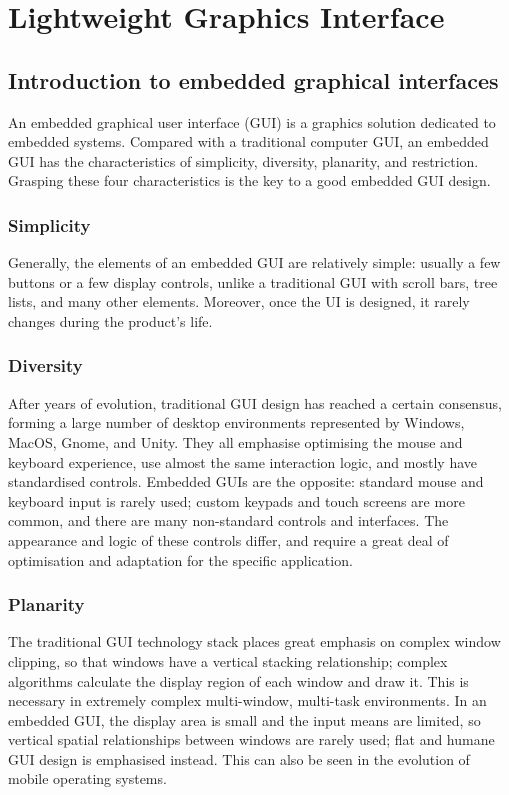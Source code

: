 \chapter{Lightweight Graphics Interface}\label{ch:gui}

\section{Introduction to embedded graphical interfaces}

An embedded graphical user interface (GUI) is a graphics solution dedicated to embedded systems.
Compared with a traditional computer GUI, an embedded GUI has the characteristics of simplicity, diversity, planarity, and restriction.
Grasping these four characteristics is the key to a good embedded GUI design.

\subsection{Simplicity}

Generally, the elements of an embedded GUI are relatively simple: usually a few buttons or a few display controls, unlike a traditional GUI with scroll bars, tree lists, and many other elements.
Moreover, once the UI is designed, it rarely changes during the product's life.

\subsection{Diversity}

After years of evolution, traditional GUI design has reached a certain consensus, forming a large number of desktop environments represented by Windows, MacOS, Gnome, and Unity.
They all emphasise optimising the mouse and keyboard experience, use almost the same interaction logic, and mostly have standardised controls.
Embedded GUIs are the opposite: standard mouse and keyboard input is rarely used; custom keypads and touch screens are more common, and there are many non-standard controls and interfaces.
The appearance and logic of these controls differ, and require a great deal of optimisation and adaptation for the specific application.

\subsection{Planarity}

The traditional GUI technology stack places great emphasis on complex window clipping, so that windows have a vertical stacking relationship; complex algorithms calculate the display region of each window and draw it.
This is necessary in extremely complex multi-window, multi-task environments.
In an embedded GUI, the display area is small and the input means are limited, so vertical spatial relationships between windows are rarely used; flat and humane GUI design is emphasised instead.
This can also be seen in the evolution of mobile operating systems.

